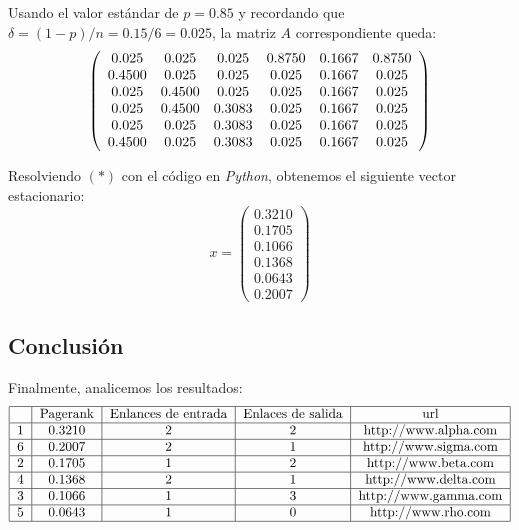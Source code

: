 \documentclass[letterpaper,11pt]{article}
\begin{document}
Usando el valor estándar de $p=0.85$ y recordando que $\delta = (1-p)/n = 0.15/6 = 0.025$, la matriz $A$ correspondiente queda:\\

\[
\left(
\begin{array}{c c c c c c}
0.025&0.025&0.025&0.8750&0.1667&0.8750\\
0.4500&0.025&0.025&0.025&0.1667&0.025\\
0.025&0.4500&0.025&0.025&0.1667&0.025\\
0.025&0.4500&0.3083&0.025&0.1667&0.025\\
0.025&0.025&0.3083&0.025&0.1667&0.025\\
0.4500&0.025&0.3083&0.025&0.1667&0.025\\
\end{array}
\right)
\]

\bigskip

Resolviendo $(*)$ con el código en \textit{Python}, obtenemos el siguiente vector estacionario:\\
\begin{equation*}
x = \left( \begin{array}{c} 0.3210\\0.1705\\0.1066\\0.1368\\0.0643\\0.2007 \end{array} \right)
\end{equation*}

\newpage
 
\subsection*{Conclusión}

Finalmente, analicemos los resultados:
\[
\begin{tabular}{| c | c | c | c | c |}
\hline
{ }&{Pagerank}&{Enlances de entrada}&{Enlaces de salida} & {url}\\
\hline
{1}&{0.3210}&{2}&{2}&{http://www.alpha.com} \\
\hline
{6}&{0.2007}&{2}&{1}&{http://www.sigma.com}\\
\hline
{2}&{0.1705}&{1}&{2}&{http://www.beta.com}\\
\hline
{4}&{0.1368}&{2}&{1}&{http://www.delta.com}\\
\hline
{3}&{0.1066}&{1}&{3}&{http://www.gamma.com}\\
\hline
{5}&{0.0643}&{1}&{0}&{http://www.rho.com}\\
\hline
\end{tabular}
\]
\end{document}
